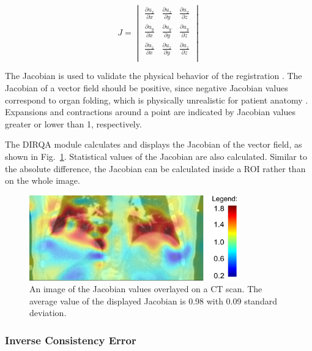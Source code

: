 \begin{equation}
J = \begin{vmatrix} 
\frac{\partial u_x}{\partial x} & \frac{\partial u_x}{\partial y} & \frac{\partial u_x}{\partial z} \\
\frac{\partial u_y}{\partial x} & \frac{\partial u_y}{\partial y} & \frac{\partial u_y}{\partial z} \\
\frac{\partial u_z}{\partial x} & \frac{\partial u_z}{\partial y} & \frac{\partial u_z}{\partial z} \\
\end{vmatrix}
\end{equation}

The Jacobian is used to validate the physical behavior of the registration \cite{Leow2007}. 
The Jacobian of a vector field should be positive, since negative Jacobian values correspond to organ folding, 
which is physically unrealistic for patient anatomy \cite{ Rey2002, Chen2008}. 
Expansions and contractions around a point are indicated by Jacobian values greater or lower than 1, respectively.

The DIRQA module calculates and displays the Jacobian of the vector field, as shown in Fig.~\ref{JacobianImage}.
Statistical values of the Jacobian are also calculated. Similar to the absolute difference, the Jacobian can be calculated inside a ROI rather than on the whole image.

\vspace{10mm}

\begin{figure}[H]
	\begin{center}		
		\includegraphics[width=0.8\textwidth]{./Vmm/Images/jacobian.png}
		\caption{An image of the Jacobian values overlayed on a CT scan. The average value of the displayed Jacobian is 0.98 with 0.09 standard deviation.}
		\label{JacobianImage}
	\end{center}
\end{figure}
\newpage

\subsubsection{Inverse Consistency Error}
\label{ICE}

